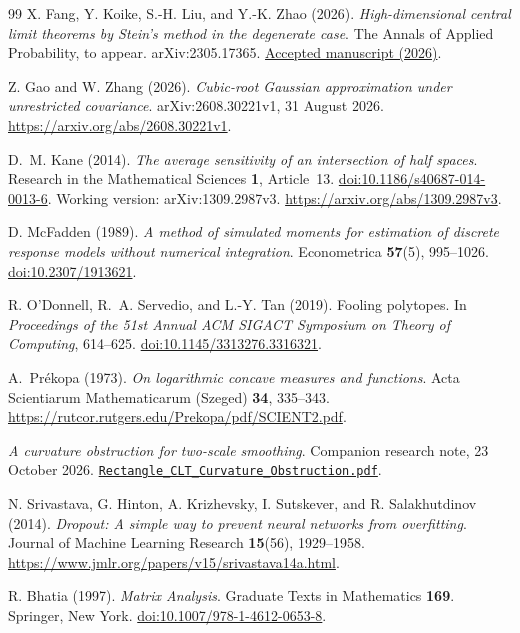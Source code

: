 \documentclass[11pt,letterpaper]{article}
\theoremstyle{remark}
\begin{document}
\begin{thebibliography}{99}
X. Fang, Y. Koike, S.-H. Liu, and Y.-K. Zhao (2026).
\emph{High-dimensional central limit theorems by Stein's method in
the degenerate case}. The Annals of Applied Probability, to appear.
arXiv:2305.17365.
\href{https://research.cuhk.edu.hk/en/publications/high-dimensional-central-limit-theorems-by-steins-method-in-the-d/}{Accepted manuscript (2026)}.

Z. Gao and W. Zhang (2026).
\emph{Cubic-root Gaussian approximation under unrestricted covariance}.
arXiv:2608.30221v1, 31 August 2026.
\url{https://arxiv.org/abs/2608.30221v1}.

D.~M. Kane (2014).
\emph{The average sensitivity of an intersection of half spaces}.
Research in the Mathematical Sciences \textbf{1}, Article~13.
\href{https://doi.org/10.1186/s40687-014-0013-6}{doi:10.1186/s40687-014-0013-6}.
Working version: arXiv:1309.2987v3.
\url{https://arxiv.org/abs/1309.2987v3}.

D. McFadden (1989).
\emph{A method of simulated moments for estimation of discrete
response models without numerical integration}.
Econometrica \textbf{57}(5), 995--1026.
\href{https://doi.org/10.2307/1913621}{doi:10.2307/1913621}.

R. O'Donnell, R.~A. Servedio, and L.-Y. Tan (2019).
Fooling polytopes.
In \emph{Proceedings of the 51st Annual ACM SIGACT Symposium on
Theory of Computing}, 614--625.
\href{https://doi.org/10.1145/3313276.3316321}{doi:10.1145/3313276.3316321}.

A.~Pr\'ekopa (1973).
\emph{On logarithmic concave measures and functions}.
Acta Scientiarum Mathematicarum (Szeged) \textbf{34}, 335--343.
\url{https://rutcor.rutgers.edu/Prekopa/pdf/SCIENT2.pdf}.

\emph{A curvature obstruction for two-scale smoothing}.
Companion research note, 23 October 2026.
\href{https://github.com/VC2015/HDCLTs/blob/main/research-rectangle-clt-singular/Rectangle_CLT_Curvature_Obstruction.pdf}{\nolinkurl{Rectangle_CLT_Curvature_Obstruction.pdf}}.

N. Srivastava, G. Hinton, A. Krizhevsky, I. Sutskever, and
R. Salakhutdinov (2014).
\emph{Dropout: A simple way to prevent neural networks from overfitting}.
Journal of Machine Learning Research \textbf{15}(56), 1929--1958.
\url{https://www.jmlr.org/papers/v15/srivastava14a.html}.

R. Bhatia (1997).
\emph{Matrix Analysis}.
Graduate Texts in Mathematics \textbf{169}. Springer, New York.
\href{https://doi.org/10.1007/978-1-4612-0653-8}{doi:10.1007/978-1-4612-0653-8}.


\end{thebibliography}
\end{document}
